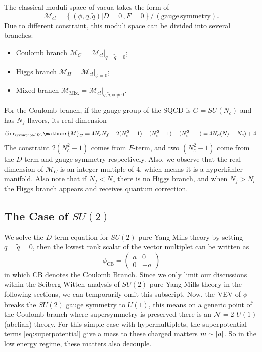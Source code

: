 \documentclass{article}
\begin{document}
The classical moduli space of vacua takes the form of 
\begin{equation}
    \mathscr{M}_{cl}=\left\{(\phi,q,\tilde{q})|D=0\,,F=0\right\}/\,(\mathrm{gauge\,symmetry}).
\end{equation}
Due to different constraint, this moduli space can be divided into several branches:
\begin{itemize}
    \item Coulomb branch $\mathscr{M}_{C}=\mathscr{M}_{cl}|_{q=\tilde{q}=0}$;
    \item Higgs branch $\mathscr{M}_{H}=\mathscr{M}_{cl}|_{\phi=0}$;
    \item Mixed branch $\mathscr{M}_{\mathrm{Mix.}}=\mathscr{M}_{cl}|_{q,\tilde{q},\phi\neq0}$.
\end{itemize}
For the Coulomb branch, if the gauge group of the SQCD is $G=SU(N_c)$ and has $N_f$ flavors, its real dimension
\begin{equation}
    \mathrm{dim}_{\vvmathbb{R}}\mathscr{M}_{C}=4N_c N_f-2(N_c^2-1)-(N_c^2-1)-(N_c^2-1)=4N_c(N_f-N_c)+4.
\end{equation}
The constraint $2(N_c^2-1)$ comes from $F$-term, and two $(N_c^2-1)$ come from the $D$-term and gauge symmetry respectively. Also, we observe that the real dimension of $\mathscr{M}_{C}$ is an integer multiple of $4$, which means it is a hyperk\"{a}hler manifold. Also note that if $N_f<N_c$ there is no Higgs branch, and when $N_f>N_c$ the Higgs branch appears and receives quantum correction.  

\subsection{The Case of $SU(2)$}
We solve the $D$-term equation for $SU(2)$ pure Yang-Mills theory by setting $q=\tilde{q}=0$, then the lowest rank scalar of the vector multiplet can be written as
\begin{equation}
\label{eq:VEV}
\phi_{\mathrm{CB}}=\left(\begin{array}{cc}
a & 0 \\
0 & -a
\end{array}\right)
\end{equation}
in which CB denotes the Coulomb Branch. Since we only limit our discussions within the Seiberg-Witten analysis of $SU(2)$ pure Yang-Mills theory in the following sections, we can temporarily omit this subscript. Now, the VEV of $\phi$ breaks the $SU(2)$ gauge symmetry to $U(1)$, this means on a generic point of the Coulomb branch where supersymmetry is preserved there is an $\mathcal{N}=2$ $U(1)$ (abelian) theory. For this simple case with hypermultiplets, the superpotential terms \eqref{eq:superpotential} give a mass to these charged matters $m\sim\abs{a}$. So in the low energy regime, these matters also decouple.
\end{document}
